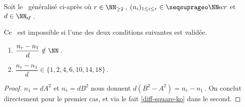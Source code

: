 \begin{fact} \label{sftable-illegal-0-sol}
	Soit le \sftab\ généralisé ci-après où
	$r \in \NN_{\geq 2}$\,,
	$( n_i )_{1 \leq i \leq r} \in \NNseq[r]$
	et
	$d \in \NNsf$\,.

    \begin{center}
    \end{center}

	Ce \sftab\ est impossible si l'une des deux conditions suivantes est validée.
	
	\begin{enumerate}
		\item $\dfrac{n_r - n_1}{d} \notin \NN$\,.

		\item $\dfrac{n_r - n_1}{d} \in \{ 1, 2, 4, 6, 10, 14, 18 \}$\,.
	\end{enumerate}
\end{fact}


\begin{proof}
	$n_1 = d A^2$ et $n_r = d B^2$ nous donnent $d (B^2 - A^2) = n_r - n_1$\,. On conclut directement pour le premier cas, et via le fait \ref{diff-square-ko} dans le second.
\end{proof}

